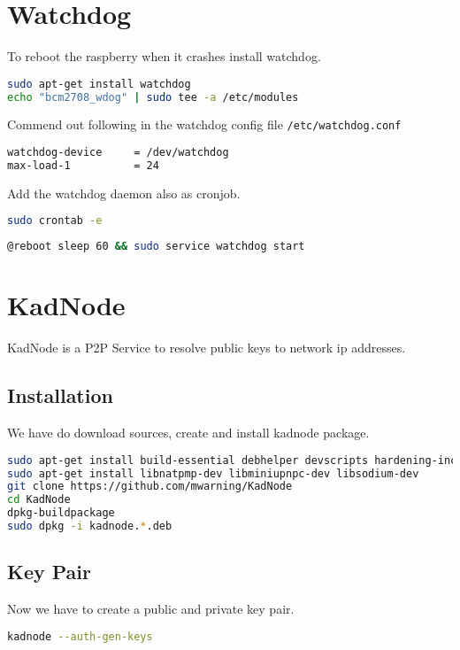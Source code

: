 \documentclass[a4paper,11pt]{report}
\begin{document}
\section{Watchdog}
To reboot the raspberry when it crashes install watchdog.
\begin{lstlisting}[language=bash,caption={watchdog}]
sudo apt-get install watchdog
echo "bcm2708_wdog" | sudo tee -a /etc/modules
\end{lstlisting}
Commend out following in the watchdog config file \texttt{/etc/watchdog.conf}
\begin{lstlisting}[language=bash,caption={/etc/watchdog.conf}]
watchdog-device		= /dev/watchdog
max-load-1			= 24
\end{lstlisting}
Add the watchdog daemon also as cronjob.
\begin{lstlisting}[language=bash]
sudo crontab -e
\end{lstlisting}
\begin{lstlisting}[language=bash,caption={crontab}]
@reboot sleep 60 && sudo service watchdog start
\end{lstlisting}

\section{KadNode}
KadNode is a P2P Service to resolve public keys to network ip addresses.

\subsection{Installation}
We have do download sources, create and install kadnode package.

\begin{lstlisting}[language=bash,caption={install kadnode}]
sudo apt-get install build-essential debhelper devscripts hardening-includes
sudo apt-get install libnatpmp-dev libminiupnpc-dev libsodium-dev
git clone https://github.com/mwarning/KadNode
cd KadNode
dpkg-buildpackage
sudo dpkg -i kadnode.*.deb
\end{lstlisting}

\subsection{Key Pair}

Now we have to create a public and private key pair.
\begin{lstlisting}[language=bash,caption={kadnode key pair}]
kadnode --auth-gen-keys
\end{lstlisting}
\end{document}
